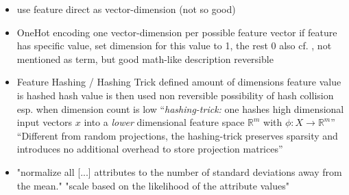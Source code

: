 \begin{itemize}
	\item use feature direct as vector-dimension (not so good)
	\item OneHot encoding
		\subitem one vector-dimension per possible feature vector
		\subitem if feature has specific value, set dimension for this value to 1, the rest 0
		\subitem also cf. \textcite[][p. 12]{Eskin2002}, not mentioned as term, but good math-like description
		\subitem reversible
	\item Feature Hashing / Hashing Trick
		\subitem defined amount of dimensions
		\subitem feature value is hashed
		\subitem hash value is then used
		\subitem non reversible
		\subitem possibility of hash collision
		\subitem esp. when dimension count is low
		\subitem \enquote{\emph{hashing-trick:} one hashes high dimensional input vectors $x$ into a \emph{lower} dimensional feature space $\mathbb{R}^m$ with $\phi: X \rightarrow \mathbb{R}^m$} \parencite{Weinberger2009,Shi2009,Langford2007}
		\subitem \enquote{Different from random projections, the hashing-trick preserves sparsity and introduces no additional overhead to store projection matrices} \parencite{Weinberger2009}
	\item "normalize all [...] attributes to the number of standard deviations away from the mean." \parencite{Eskin2002}
		\subitem "scale based on the likelihood of the attribute values" \parencite{Eskin2002}
		
\end{itemize}